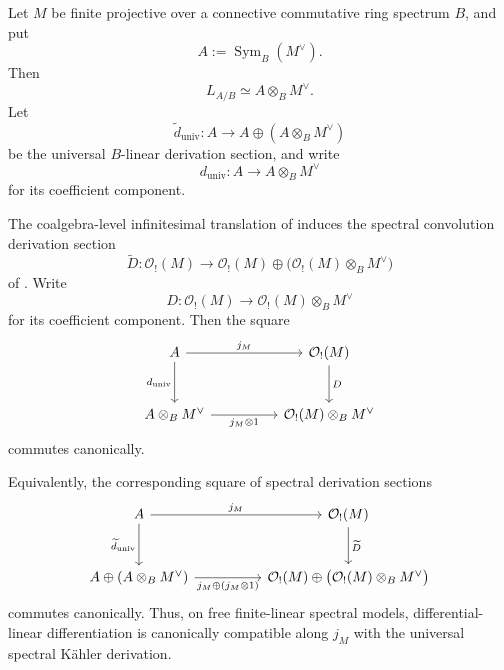 \begin{theorem}
\label{thm:dill-kahler-comparison}
Let \(M\) be finite projective over a connective commutative ring spectrum
\(B\), and put
\[
    A:=\operatorname{Sym}_B(M^\vee).
\]
Then
\[
    L_{A/B}\simeq A\otimes_BM^\vee.
\]
Let
\[
    \widetilde d_{\mathrm{univ}}:
    A
    \longrightarrow
    A\oplus(A\otimes_BM^\vee)
\]
be the universal \(B\)-linear derivation section, and write
\[
    d_{\mathrm{univ}}:
    A
    \longrightarrow
    A\otimes_BM^\vee
\]
for its coefficient component.

The coalgebra-level infinitesimal translation of
 induces the spectral
convolution derivation section
\[
    \widetilde D:
    \mathcal O_!(M)
    \longrightarrow
    \mathcal O_!(M)
    \oplus
    \bigl(\mathcal O_!(M)\otimes_BM^\vee\bigr)
\]
of . Write
\[
    D:
    \mathcal O_!(M)
    \longrightarrow
    \mathcal O_!(M)\otimes_BM^\vee
\]
for its coefficient component. Then the square
\[
\begin{tikzcd}[column sep=huge,row sep=large]
    A \arrow[r,"j_M"] \arrow[d,"d_{\mathrm{univ}}"']
        & \mathcal O_!(M) \arrow[d,"D"]
    \\
    A\otimes_BM^\vee \arrow[r,"j_M\otimes1"']
        & \mathcal O_!(M)\otimes_BM^\vee
\end{tikzcd}
\]
commutes canonically.

Equivalently, the corresponding square of spectral derivation sections
\[
\begin{tikzcd}[column sep=huge,row sep=large]
    A \arrow[r,"j_M"] \arrow[d,"\widetilde d_{\mathrm{univ}}"']
        & \mathcal O_!(M) \arrow[d,"\widetilde D"]
    \\
    A\oplus(A\otimes_BM^\vee)
        \arrow[r,"{j_M\oplus(j_M\otimes1)}"']
        &
    \mathcal O_!(M)
        \oplus
        \bigl(\mathcal O_!(M)\otimes_BM^\vee\bigr)
\end{tikzcd}
\]
commutes canonically. Thus, on free finite-linear spectral models,
differential-linear differentiation is canonically compatible along \(j_M\)
with the universal spectral K\"ahler derivation.
\end{theorem}

